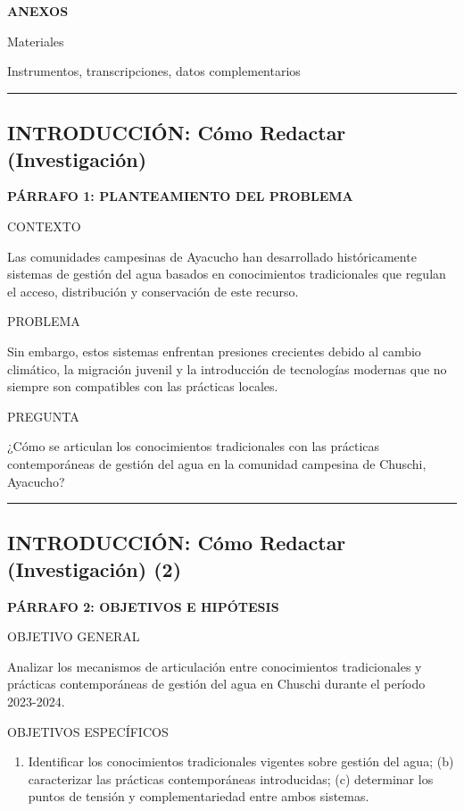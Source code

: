 \documentclass[
  11pt,
]{beaner}
\providecommand{\tightlist}{%
  \setlength{\itemsep}{0pt}\setlength{\parskip}{0pt}}
\begin{document}
\textbf{ANEXOS}

Materiales

Instrumentos, transcripciones, datos complementarios

\begin{center}\rule{0.5\linewidth}{0.5pt}\end{center}

\subsection{INTRODUCCIÓN: Cómo Redactar
(Investigación)}\label{introducciuxf3n-cuxf3mo-redactar-investigaciuxf3n}

\textbf{PÁRRAFO 1: PLANTEAMIENTO DEL PROBLEMA}

{CONTEXTO}

Las comunidades campesinas de Ayacucho han desarrollado históricamente
sistemas de gestión del agua basados en conocimientos tradicionales que
regulan el acceso, distribución y conservación de este recurso.

{PROBLEMA}

Sin embargo, estos sistemas enfrentan presiones crecientes debido al
cambio climático, la migración juvenil y la introducción de tecnologías
modernas que no siempre son compatibles con las prácticas locales.

{PREGUNTA}

¿Cómo se articulan los conocimientos tradicionales con las prácticas
contemporáneas de gestión del agua en la comunidad campesina de Chuschi,
Ayacucho?

\begin{center}\rule{0.5\linewidth}{0.5pt}\end{center}

\subsection{INTRODUCCIÓN: Cómo Redactar (Investigación)
(2)}\label{introducciuxf3n-cuxf3mo-redactar-investigaciuxf3n-2}

\textbf{PÁRRAFO 2: OBJETIVOS E HIPÓTESIS}

{OBJETIVO GENERAL}

Analizar los mecanismos de articulación entre conocimientos
tradicionales y prácticas contemporáneas de gestión del agua en Chuschi
durante el período 2023-2024.

{OBJETIVOS ESPECÍFICOS}

\begin{enumerate}
\def\labelenumi{(\alph{enumi})}
\tightlist
\item
  Identificar los conocimientos tradicionales vigentes sobre gestión del
  agua; (b) caracterizar las prácticas contemporáneas introducidas; (c)
  determinar los puntos de tensión y complementariedad entre ambos
  sistemas.
\end{enumerate}
\end{document}

